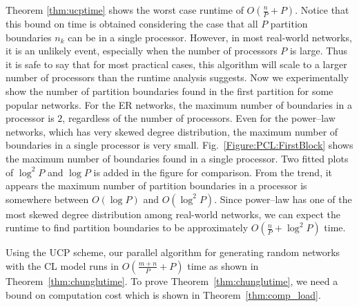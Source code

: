 \documentclass[conference,letterpaper,10pt]{IEEEtran}
\newcommand{\Figure}{Fig.\xspace}
\begin{document}
Theorem \ref{thm:ucptime} shows the worst case runtime of $O(\frac{n}{P}+ P)$.
Notice that this bound on time is obtained considering the case that all $P$ partition boundaries $n_{k}$ can be in a single processor. However, in most real-world networks, it is an unlikely event, especially when the number of processors $P$ is large. Thus it is safe to say that for most practical cases, this algorithm will scale to a larger number of processors than the runtime analysis suggests. Now we experimentally show the number of partition boundaries found in the first partition for some popular networks.
For the ER networks, the maximum number of boundaries in a processor is  $2$, regardless of the number of processors. Even for the power--law networks, which has very skewed degree distribution, the maximum number of boundaries in a single processor is very small.
\Figure~\ref{Figure:PCL:FirstBlock} shows the maximum number of boundaries found in a single processor. Two fitted plots of $\log^2 P$ and $\log P$ is added in the figure for comparison. From the trend, it appears the maximum number of partition boundaries in a processor is somewhere between $O(\log P)$ and $O(\log^2{P})$. Since power--law has one of the most skewed degree distribution among real-world networks, we can expect the runtime to find partition boundaries to be approximately $O(\frac{n}{P}+\log^2P)$ time.


Using the UCP  scheme, our parallel algorithm for generating random networks with the CL model runs in $O(\frac{m+n}{P} + P)$  time as shown in Theorem~\ref{thm:chunglutime}. To prove Theorem~\ref{thm:chunglutime}, we need a bound on computation cost which is shown in Theorem~\ref{thm:comp_load}.
\end{document}
